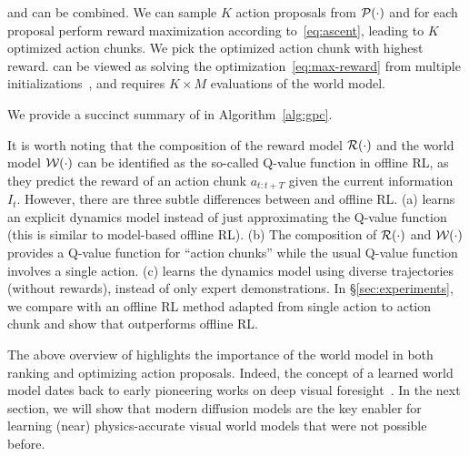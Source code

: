 \gpcrank and \gpcopt can be combined. We can sample $K$ action proposals from ${\cal P}(\cdot)$ and for each proposal perform reward maximization according to~\eqref{eq:ascent}, leading to $K$ optimized action chunks. We pick the optimized action chunk with highest reward. \gpcrankopt can be viewed as solving the optimization~\eqref{eq:max-reward} from multiple initializations~\cite{sharony2024learning}, and requires $K\times M$ evaluations of the world model. 

We provide a succinct summary of \nameshort in Algorithm~\ref{alg:gpc}. 




\begin{remark}\label{offline-rl}
    It is worth noting that the composition of the reward model ${\cal R}(\cdot)$ and the world model ${\cal W}(\cdot)$ can be identified as the so-called Q-value function in offline RL, as they predict the reward of an action chunk $a_{t:t+T}$ given the current information $I_t$. However, there are three subtle differences between \nameshort and offline RL. (a) \nameshort learns an explicit dynamics model instead of just approximating the Q-value function (this is similar to model-based offline RL). (b) The composition of ${\cal R}(\cdot)$ and ${\cal W}(\cdot)$ provides a Q-value function for ``action chunks'' while the usual Q-value function involves a single action. (c) \nameshort learns the dynamics model using diverse trajectories (without rewards), instead of only expert demonstrations. In \S\ref{sec:experiments}, we compare \nameshort with an offline RL method adapted from single action to action chunk and show that \nameshort outperforms offline RL.
\end{remark}

The above overview of \nameshort highlights the importance of the world model in both ranking and optimizing action proposals. Indeed, the concept of a learned world model dates back to early pioneering works on deep visual foresight~\cite{finn2017deep}. In the next section, we will show that modern diffusion models are the key enabler for learning (near) physics-accurate visual world models that were not possible before. 